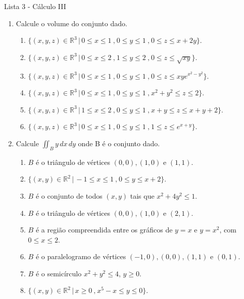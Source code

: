 \documentclass[11pt,a4paper]{article}
\begin{document}
	\begin{center}
		\Large Lista 3 - Cálculo III
	\end{center}
	

	\begin{enumerate}
		\item Calcule o volume do conjunto dado.
			\begin{enumerate}
				\item $\{(x,y,z) \in \mathbb{R}^3 \,|\, 0 \leq x \leq 1\ \textrm{,}\ 0 \leq y \leq 1\ \textrm{,}\ 0 \leq z \leq x + 2y\}$.	
				\item $\{(x,y,z) \in \mathbb{R}^3 \,|\, 0 \leq x \leq 2\ \textrm{,}\ 1 \leq y \leq 2\ \textrm{,}\ 0 \leq z \leq \sqrt{xy}\}$.
				\item $\{(x,y,z) \in \mathbb{R}^3 \,|\, 0 \leq x \leq 1\ \textrm{,}\ 0 \leq y \leq 1\ \textrm{,}\ 0 \leq z \leq xye^{x^2 - y^2}\}$.
				\item $\{(x,y,z) \in \mathbb{R}^3 \,|\, 0 \leq x \leq 1\ \textrm{,}\ 0 \leq y \leq 1\ \textrm{,}\ x^2 + y^2 \leq z \leq 2\}$.
				\item $\{(x,y,z) \in \mathbb{R}^3 \,|\, 1 \leq x \leq 2\ \textrm{,}\ 0 \leq y \leq 1\ \textrm{,}\ x + y \leq z \leq x + y + 2\}$.
				\item $\{(x,y,z) \in \mathbb{R}^3 \,|\, 0 \leq x \leq 1\ \textrm{,}\ 0 \leq y \leq 1\ \textrm{,}\ 1 \leq z \leq e^{x + y}\}$.
			\end{enumerate}
			
		\item Calcule $\displaystyle\iint_B y \,dx\,dy$ onde B é o conjunto dado.
		
		\begin{enumerate}
			\item $B$ é o triângulo de vértices $(0,0),(1,0) \textrm{ e } (1,1)$.
			\item $\{(x,y) \in \mathbb{R}^2 \,|\, -1 \leq x \leq 1\ \textrm{,}\ 0 \leq y \leq x + 2\}$.
			\item $B$ é o conjunto de todos $(x,y)$ tais que $x^2 + 4y^2 \leq 1$.
			\item $B$ é o triângulo de vértices $(0,0),(1,0) \textrm{ e } (2,1)$.
			\item $B$ é a região compreendida entre os gráficos de $y = x$ e $y = x^2$, com $0 \leq x \leq 2 $.
			\item $B$ é o paralelogramo de vértices $(-1,0),(0,0),(1,1) \textrm{ e } (0,1)$.
			\item $B$ é o semicírculo $x^2 + y^2 \leq 4$, $y \geq 0$.
			\item $\{(x,y) \in \mathbb{R}^2 \,|\, x \geq 0\ \textrm{,}\ x^5 - x \leq y \leq 0\}$.
		\end{enumerate}
		

\end{enumerate}
\end{document}

